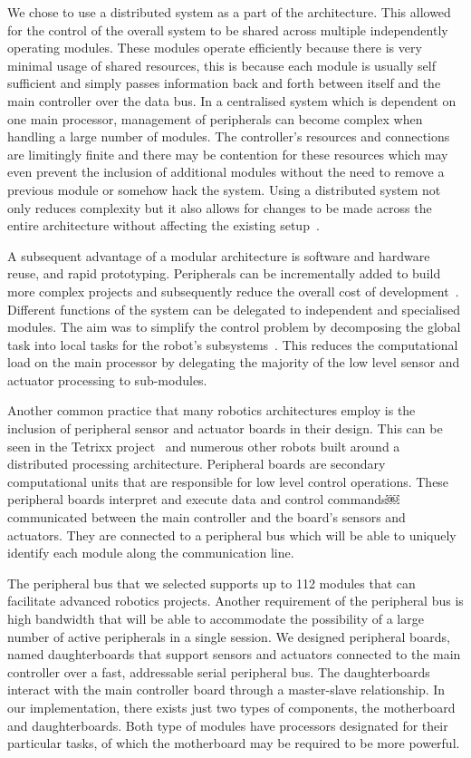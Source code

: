 We chose to use a distributed system as a part of the architecture. This allowed for the control of the overall system to be shared across multiple independently operating modules. These modules operate efficiently because there is very minimal usage of shared resources, this is because each module is usually self sufficient and simply passes information back and forth between itself and the main controller over the data bus. In a centralised system which is dependent on one main processor, management of peripherals can become complex when handling a large number of modules. The controller's resources and connections are limitingly finite and there may be contention for these resources which may even prevent the inclusion of additional modules without the need to remove a previous module or somehow hack the system.  Using a distributed system not only reduces complexity but it also allows for changes to be made across the entire architecture without affecting the existing setup~\parencite{avcithesis}.

A subsequent advantage of a modular architecture is software and hardware reuse, and rapid prototyping. Peripherals can be incrementally added to build more complex projects and subsequently reduce the overall cost of development~\parencite{modcom}. Different functions of the system can be delegated to independent and specialised modules. The aim was to simplify the control problem by decomposing the global task into local tasks for the robot's subsystems~\parencite{rdk}. This reduces the computational load on the main processor by delegating the majority of the low level sensor and actuator processing to sub-modules. 

Another common practice that many robotics architectures employ is the inclusion of peripheral sensor and actuator boards in their design. This can be seen in the Tetrixx project~\parencite{tetrixx} and numerous other robots built around a distributed processing architecture. Peripheral boards are secondary computational units that are responsible for low level control operations. These peripheral boards interpret and execute data and control commands￼communicated between the main controller and the board's sensors and actuators. They are connected to a peripheral bus which will be able to uniquely identify each module along the communication line. 

The peripheral bus that we selected supports up to 112 modules that can facilitate advanced robotics projects. Another requirement of the peripheral bus is high bandwidth that will be able to accommodate the possibility of a large number of active peripherals in a single session. We designed peripheral boards, named daughterboards that support sensors and actuators connected to the main controller over a fast, addressable serial peripheral bus. The daughterboards interact with the main controller board through a master-slave relationship. In our implementation, there exists just two types of components, the motherboard and daughterboards. Both type of modules have processors designated for their particular tasks, of which the motherboard may be required to be more powerful.



